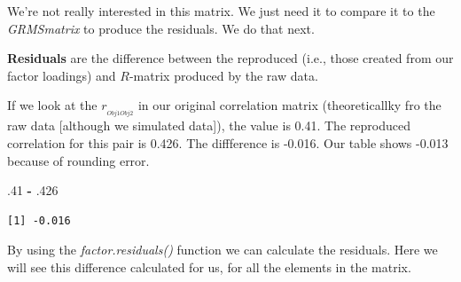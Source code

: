 \documentclass[
  english,
]{book}
\newenvironment{Shaded}{\begin{snugshade}}{\end{snugshade}}
\newcommand{\DecValTok}[1]{\textcolor[rgb]{0.00,0.00,0.81}{#1}}
\newcommand{\FloatTok}[1]{\textcolor[rgb]{0.00,0.00,0.81}{#1}}
\newcommand{\KeywordTok}[1]{\textcolor[rgb]{0.13,0.29,0.53}{\textbf{#1}}}
\newcommand{\NormalTok}[1]{#1}
\newcommand{\OperatorTok}[1]{\textcolor[rgb]{0.81,0.36,0.00}{\textbf{#1}}}
\newcommand{\StringTok}[1]{\textcolor[rgb]{0.31,0.60,0.02}{#1}}
\begin{document}
We're not really interested in this matrix. We just need it to compare it to the \emph{GRMSmatrix} to produce the residuals. We do that next.

\textbf{Residuals} are the difference between the reproduced (i.e., those created from our factor loadings) and \(R\)-matrix produced by the raw data.

If we look at the \(r_{_{Obj1Obj2}}\) in our original correlation matrix (theoreticallky fro the raw data {[}although we simulated data{]}), the value is 0.41. The reproduced correlation for this pair is 0.426. The diffference is -0.016. Our table shows -0.013 because of rounding error.

\begin{Shaded}
\begin{Highlighting}[]
\FloatTok{.41} \OperatorTok{-}\StringTok{ }\FloatTok{.426}
\end{Highlighting}
\end{Shaded}

\begin{verbatim}
[1] -0.016
\end{verbatim}

By using the \emph{factor.residuals()} function we can calculate the residuals. Here we will see this difference calculated for us, for all the elements in the matrix.

\begin{Shaded}
\end{Shaded}
\end{document}
